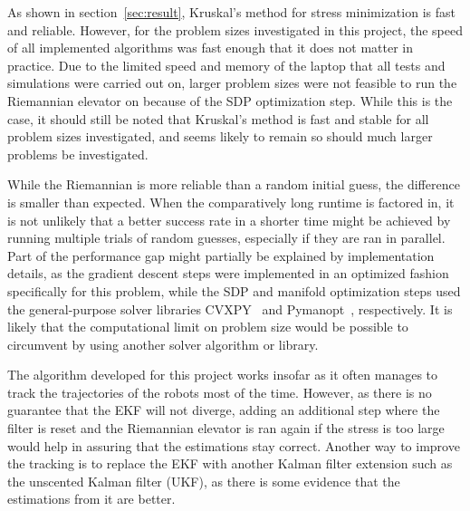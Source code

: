 As shown in section~\ref{sec:result}, Kruskal's method for stress minimization is fast and reliable. However, for the problem sizes investigated in this project, the speed of all implemented algorithms was fast enough that it does not matter in practice. Due to the limited speed and memory of the laptop that all tests and simulations were carried out on, larger problem sizes were not feasible to run the Riemannian elevator on because of the SDP optimization step. While this is the case, it should still be noted that Kruskal's method is fast and stable for all problem sizes investigated, and seems likely to remain so should much larger problems be investigated. 

While the Riemannian is more reliable than a random initial guess, the difference is smaller than expected. When the comparatively long runtime is factored in, it is not unlikely that a better success rate in a shorter time might be achieved by running multiple trials of random guesses, especially if they are ran in parallel. Part of the performance gap might partially be explained by implementation details, as the gradient descent steps were implemented in an optimized fashion specifically for this problem, while the SDP and manifold optimization steps used the general-purpose solver libraries CVXPY~\cite{cvxpy1,cvxpy2} and Pymanopt~\cite{pymanopt}, respectively. It is likely that the computational limit on problem size would be possible to circumvent by using another solver algorithm or library. 

The algorithm developed for this project works insofar as it often manages to track the trajectories of the robots most of the time. However, as there is no guarantee that the EKF will not diverge, adding an additional step where the filter is reset and the Riemannian elevator is ran again if the stress is too large would help in assuring that the estimations stay correct. Another way to improve the tracking is to replace the EKF with another Kalman filter extension such as the unscented Kalman filter (UKF), as there is some evidence that the estimations from it are better.